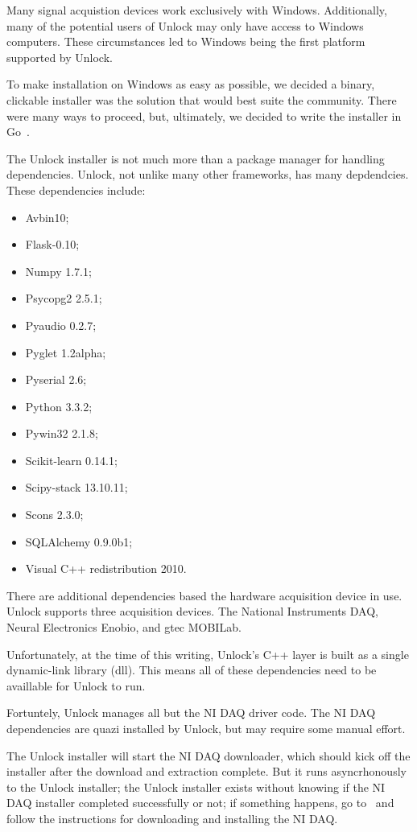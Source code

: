 \documentclass[11pt]{article}
\begin{document}
Many signal acquistion devices work exclusively with Windows.  Additionally, many of the potential users of Unlock may only have access to Windows computers.  These circumstances led to Windows being the first platform supported by Unlock.

To make installation on Windows as easy as possible, we decided a binary, clickable installer was the solution that would best suite the community.  There were many ways to proceed, but, ultimately, we decided to write the installer in Go~\cite{golang}.  

The Unlock installer is not much more than a package manager for handling dependencies.  Unlock, not unlike many other frameworks, has many depdendcies.  These dependencies include:
\begin{itemize}
\item Avbin10;
\item Flask-0.10;
\item Numpy 1.7.1;
\item Psycopg2 2.5.1;
\item Pyaudio 0.2.7;
\item Pyglet 1.2alpha;
\item Pyserial 2.6;
\item Python 3.3.2;
\item Pywin32 2.1.8;
\item Scikit-learn 0.14.1;
\item Scipy-stack 13.10.11;
\item Scons 2.3.0;
\item SQLAlchemy 0.9.0b1;
\item Visual C++ redistribution 2010.
\end{itemize}

There are additional dependencies based the hardware acquisition device in use.  Unlock supports three acquisition devices.  The National Instruments DAQ, Neural Electronics Enobio, and gtec MOBILab.  

Unfortunately, at the time of this writing, Unlock's C++ layer is built as a single dynamic-link library (dll).  This means all of these dependencies need to be availlable for Unlock to run.  

Fortuntely, Unlock manages all but the NI DAQ driver code.  The NI DAQ dependencies are quazi installed by Unlock, but may require some manual effort.  

The Unlock installer will start the NI DAQ downloader, which should kick off the installer after the download and extraction complete.  But it runs asyncrhonously to the Unlock installer; the Unlock installer exists without knowing if the NI DAQ installer completed successfully or not; if something happens, go to~\cite{nidaq} and follow the instructions for downloading and installing the NI DAQ.
\end{document}

